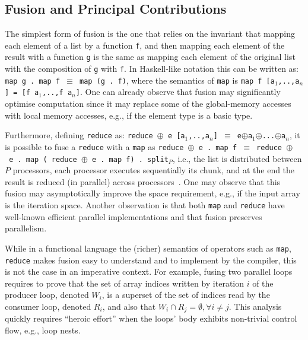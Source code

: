 \documentclass{sigplanconf}  %
\newcommand{\emp}[1]{\textcolor{DikuRed}{ #1}}
\begin{document}
\subsection{Fusion and Principal Contributions}
\label{subsec:introfusion}

%
The simplest form of fusion is the one that
relies on the invariant that mapping each element   %
of a list by a function {\tt f}, and then mapping each element 
of the result with a function {\tt g} is the same as
mapping each element of the original list with the 
composition of {\tt g} with {\tt f}. In Haskell-like notation
this can be written as: \\ {\tt map g . map f $\equiv$ map (g . f)},
where the semantics of {\tt map} is  
{\tt map f [a$_1$,..,a$_n$] = [f a$_1$,..,f a$_n$]}.
%
One can already observe that fusion may significantly optimise 
computation since it may replace some of the global-memory
accesses with local memory accesses, e.g., if the element type
is a basic type.
%

Furthermore, defining {\tt reduce} as: 
{\tt reduce $\oplus$ e [a$_1$,..,a$_n$] $\equiv$ e$\oplus$a$_1$$\oplus$...$\oplus$a$_n$},
it is possible to fuse a {\tt reduce} with a {\tt map} as
{\tt reduce~$\oplus$~e~.~map~f~$\equiv$~reduce~$\oplus$~e~.~map~(\emp{reduce~$\oplus$~e .~map~f}) . split$_P$},
i.e., the list is distributed between $P$ processors, each processor executes \emp{sequentially} 
its chunk, and at the end the result is reduced (in parallel) across processors~\cite{BirdListTh}.
One may observe that this fusion may asymptotically improve the space requirement, e.g.,
if the input array is the iteration space. 
%
Another observation is that both {\tt map} and {\tt reduce} have well-known 
efficient parallel implementations and that fusion preserves parallelism. 

While in a functional language the (richer) semantics of operators
such as {\tt map}, {\tt reduce} makes fusion easy to understand and to implement 
by the compiler, this is not the case in an imperative context.
For example, fusing two   %
parallel loops requires to prove that the set of array indices 
written by iteration $i$ of the producer loop, denoted $W_i$, is a 
superset of the set of indices read by the consumer loop, denoted $R_i$, and also
that $W_i \cap R_j = \emptyset, \forall i \neq j$.
%
This analysis quickly requires ``heroic effort'' when the loops' 
body exhibits non-trivial control flow, e.g., loop nests.
\end{document}
